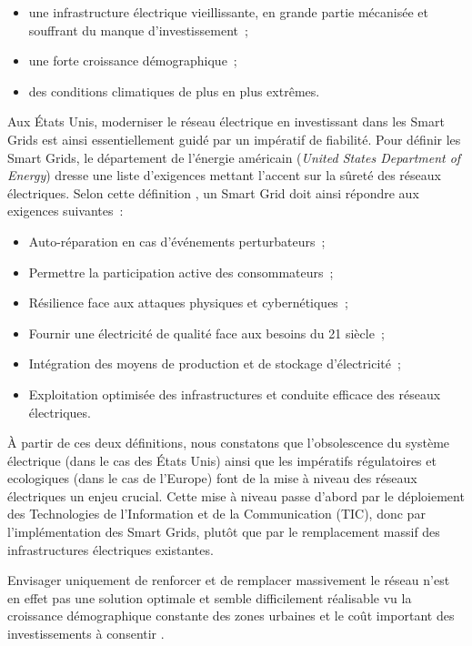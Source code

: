 \begin{itemize}
    \item une infrastructure électrique vieillissante, en grande partie
    mécanisée et souffrant du manque d'investissement~;
    \item une forte croissance démographique~;
    \item des conditions climatiques de plus en plus extrêmes.
\end{itemize}

Aux États Unis, moderniser le réseau électrique en investissant dans les Smart 
Grids est ainsi essentiellement guidé par un impératif de fiabilité. Pour 
définir les Smart Grids, le département de l'énergie américain (\textit{United 
States Department of Energy}) dresse une liste d'exigences mettant l'accent sur 
la sûreté des réseaux électriques. Selon cette définition \cite{USDE}, un Smart 
Grid doit ainsi répondre aux exigences suivantes~:

\begin{itemize}
\item Auto-réparation en cas d'événements perturbateurs~;
\item Permettre la participation active des consommateurs~; 
\item Résilience face aux attaques physiques et cybernétiques~;
\item Fournir une électricité de qualité face aux besoins du 21 siècle~;
\item Intégration des moyens de production et de stockage d'électricité~;
\item Exploitation optimisée des infrastructures et conduite efficace des 
réseaux électriques.
\end{itemize} 

À partir de ces deux définitions, nous constatons que l'obsolescence du système 
électrique (dans le cas des États Unis) ainsi que les impératifs régulatoires et 
ecologiques (dans le cas de l'Europe) font de la mise à niveau des réseaux 
électriques un enjeu crucial. Cette mise à niveau passe d'abord par le 
déploiement des Technologies de l'Information et de la Communication (TIC), donc 
par l'implémentation des Smart Grids, plutôt que par le remplacement massif des 
infrastructures électriques existantes.

Envisager uniquement de renforcer et de remplacer massivement le réseau 
n'est en effet pas une solution optimale et semble difficilement réalisable vu 
la croissance démographique constante des zones urbaines et le coût important 
des investissements à consentir \cite{cre}.

